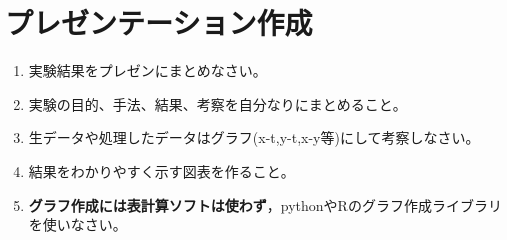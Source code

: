 \documentclass{ltjsarticle}
\begin{document}

\section{プレゼンテーション作成}
\begin{enumerate}
\item 実験結果をプレゼンにまとめなさい。
\item 実験の目的、手法、結果、考察を自分なりにまとめること。
\item 生データや処理したデータはグラフ(x-t,y-t,x-y等)にして考察しなさい。
\item 結果をわかりやすく示す図表を作ること。
\item \textbf{グラフ作成には表計算ソフトは使わず}，pythonやRのグラフ作成ライブラリを使いなさい。
\end{enumerate}

\end{document}
